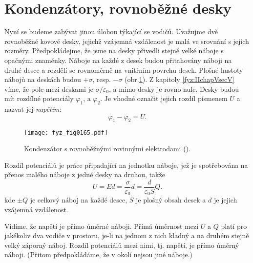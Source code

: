 \section{Kondenzátory, rovnoběžné desky}\label{fyz:IIchapVsecXIX}
  Nyní se budeme zabývat jinou úlohou týkající se vodičů. Uvažujme dvě rovnoběžné kovové 
  desky, jejichž vzájemná vzdálenost je malá ve srovnání s jejich rozměry. Předpokládejme, že jsme
  na desky přivedli stejně velké náboje s opačnými znaménky. Náboje na každé z desek budou 
  přitahovány náboji na druhé desce a rozdělí se rovnoměrně na vnitřním povrchu desek. Plošné
  hustoty nábojů na deskách budou \(+\sigma\), resp. \(-\sigma\) (obr.\ref{fyz:fig0165}). Z kapitoly 
  \ref{fyz:IIchapVsecV} víme, že pole mezi deskami je \(\sigma/\varepsilon_0\), a mimo desky je 
  rovno nule. Desky budou mít rozdílné potenciály \(\varphi_1\), a \(\varphi_2\). Je vhodné označit 
  jejich rozdíl písmenem \(U\) a nazvat jej \emph{napětím}:
  \begin{equation}\label{fyz:eq292}
    \varphi_1 - \varphi_2 = U.
  \end{equation}
  
  \begin{figure}[ht!]  %
    \centering
    \texttt{[image: fyz\_fig0165.pdf]}
    \caption{Kondenzátor s rovnoběžnými rovinnými elektrodami 
             (\cite[s.~114]{Feynman02}).}
    \label{fyz:fig0165}
  \end{figure}
  
  Rozdíl potenciálů je práce připadající na jednotku náboje, jež je spotřebována na přenos malého 
  náboje z jedné desky na druhou, takže
  \begin{equation}\label{fyz:eq293}
    U = Ed = \dfrac{\sigma}{\varepsilon_0}d = \dfrac{d}{\varepsilon_0S}Q.
  \end{equation}
  kde \(\pm Q\) je celkový náboj na každé desce, \(S\) je plošný obsah desek a \(d\) je jejich 
  vzájemná vzdálenost.
  
  Vidíme, že napětí je přímo úměrné náboji. Přímá úměrnost mezi \(U\) a \(Q\) platí pro jakékoliv 
  dva vodiče v prostoru, je-li na jednom z nich kladný a na druhém stejně velký záporný náboj. 
  Rozdíl potenciálů mezi nimi, tj. napětí, je přímo úměrný náboji. (Přitom předpokládáme, že v 
  okolí nejsou jiné náboje.)
  
